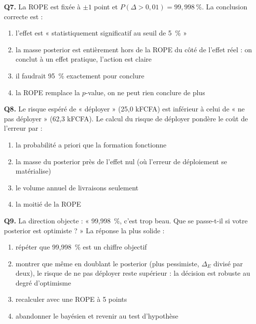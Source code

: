 \documentclass[11pt,a4paper]{article}
\begin{document}
\begin{qcmbox}[Questions 7 à 9]
\textbf{Q7.} La ROPE est fixée à $\pm 1$ point et
$P(\Delta > 0{,}01) = 99{,}998~\%$. La conclusion correcte est :
\begin{enumerate}[label=\Alph*.), leftmargin=8mm, itemsep=0.3mm]
  \item l'effet est « statistiquement significatif au seuil de 5~\% »
  \item la masse posterior est entièrement hors de la ROPE du côté de
        l'effet réel : on conclut à un effet pratique, l'action est claire
  \item il faudrait 95~\% exactement pour conclure
  \item la ROPE remplace la $p$-value, on ne peut rien conclure de plus
\end{enumerate}

\vspace{2mm}
\textbf{Q8.} Le risque espéré de « déployer » (25,0 kFCFA) est inférieur à
celui de « ne pas déployer » (62,3 kFCFA). Le calcul du risque de déployer
pondère le coût de l'erreur par :
\begin{enumerate}[label=\Alph*.), leftmargin=8mm, itemsep=0.3mm]
  \item la probabilité a priori que la formation fonctionne
  \item la masse du posterior près de l'effet nul (où l'erreur de déploiement
        se matérialise)
  \item le volume annuel de livraisons seulement
  \item la moitié de la ROPE
\end{enumerate}

\vspace{2mm}
\textbf{Q9.} La direction objecte : « 99{,}998~\%, c'est trop beau. Que se
passe-t-il si votre posterior est optimiste ? » La réponse la plus solide :
\begin{enumerate}[label=\Alph*.), leftmargin=8mm, itemsep=0.3mm]
  \item répéter que 99{,}998~\% est un chiffre objectif
  \item montrer que même en doublant le posterior (plus pessimiste,
        $\Delta_E$ divisé par deux), le risque de ne pas déployer reste
        supérieur : la décision est robuste au degré d'optimisme
  \item recalculer avec une ROPE à 5 points
  \item abandonner le bayésien et revenir au test d'hypothèse
\end{enumerate}
\end{qcmbox}
\end{document}

